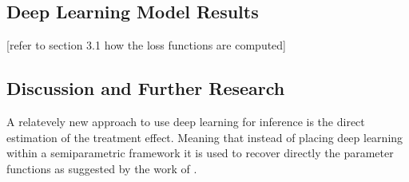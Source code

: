 \subsection{Deep Learning Model Results}
[refer to section 3.1 how the loss functions are computed]




\subsection{Discussion and Further Research}


A relatevely new approach to use deep learning for inference is the direct estimation of the treatment effect.
Meaning that instead of placing deep learning within a semiparametric framework it is used to recover directly the parameter functions as suggested by the work of \citet{DeepLearningIndividual2021}.
